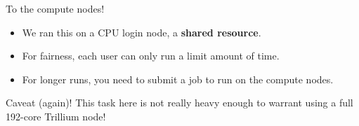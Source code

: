 \documentclass[
  10pt,
  ignorenonframetext,
  aspectratio=169,handout]{beamer}
\newenvironment{Shaded}{\begin{snugshade}}{\end{snugshade}}
\newcommand{\ExtensionTok}[1]{\textcolor[rgb]{0.80,0.80,0.80}{#1}}
\newcommand{\KeywordTok}[1]{\textcolor[rgb]{0.94,0.87,0.69}{#1}}
\newcommand{\NormalTok}[1]{\textcolor[rgb]{0.80,0.80,0.80}{#1}}
\begin{document}
\begin{frame}[fragile]{To the compute nodes!}
\label{to-the-compute-nodes}
\begin{Shaded}
\end{Shaded}

\begin{itemize}
\item
  We ran this on a CPU login node, a \textbf{shared resource}.
\item
  For fairness, each user can only run a limit amount of time.

  \pause
\item
  For longer runs, you need to submit a job to run on the compute nodes.

  \pause
\end{itemize}

\alert{Caveat (again)! This task here is not really heavy enough to warrant using a full 192-core Trillium node!}
\end{frame}
\end{document}
